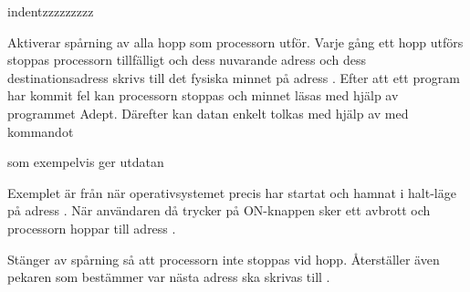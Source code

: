 \documentclass[main.tex]{subfiles}
\begin{document}
\begin{labeling}{indentzzzzzzzzz}
\item[\mono{trace\_enable}]
    Aktiverar spårning av alla hopp som processorn utför. Varje gång ett hopp
    utförs stoppas processorn tillfälligt och dess nuvarande adress och dess
    destinationsadress skrivs till det fysiska minnet på adress .
    Efter att ett program har kommit fel kan processorn stoppas och minnet
    läsas med hjälp av programmet Adept. Därefter kan datan enkelt tolkas med
    hjälp av  med kommandot
    
    som exempelvis ger utdatan
    
    Exemplet är från när operativsystemet precis har startat och hamnat i
    halt-läge på adress . När användaren då trycker på ON-knappen
    sker ett avbrott och processorn hoppar till adress .
\item[\mono{trace\_disable}]
    Stänger av spårning så att processorn inte stoppas vid hopp. Återställer
    även pekaren som bestämmer var nästa adress ska skrivas till
    .
\end{labeling}

\clearpage
\end{document}
